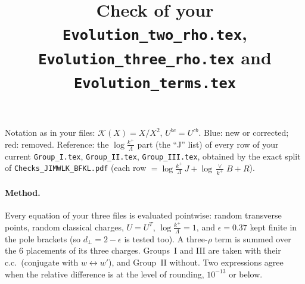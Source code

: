 \documentclass[10pt]{article}
\title{Check of your \texttt{Evolution\_two\_rho.tex}, \texttt{Evolution\_three\_rho.tex} and \texttt{Evolution\_terms.tex}}
\date{}
\numberwithin{equation}{section}
\newcommand{\new}[1]{{\color{blue}#1}}
\newcommand{\old}[1]{{\color{red}#1}}
\begin{document}
\maketitle
\noindent Notation as in your files: $\mathcal K(X)=X/X^2$, $U^{bc}=U^{cb}$. \new{Blue}: new or corrected; \old{red}: removed. Reference: the $\log\frac{k^+}{\Lambda}$ part (the ``J'' list) of every row of your current \texttt{Group\_I.tex}, \texttt{Group\_II.tex}, \texttt{Group\_III.tex}, obtained by the exact split of \texttt{Checks\_JIMWLK\_BFKL.pdf} (each row $=\log\frac{k^+}{\Lambda}\,J+\log\frac{\vee}{k^+}\,B+R$).

\paragraph{Method.} Every equation of your three files is evaluated pointwise: random transverse points, random classical charges, $U=U^{T}$, $\log\frac{k^+}{\Lambda}=1$, and $\epsilon=0.37$ kept finite in the pole brackets (so $d_\perp=2-\epsilon$ is tested too). A three-$\rho$ term is summed over the $6$ placements of its three charges. Groups~I and III are taken with their c.c.\ (conjugate with $w\leftrightarrow w'$), and Group~II without. Two expressions agree when the relative difference is at the level of rounding, $10^{-13}$ or below.
\end{document}
